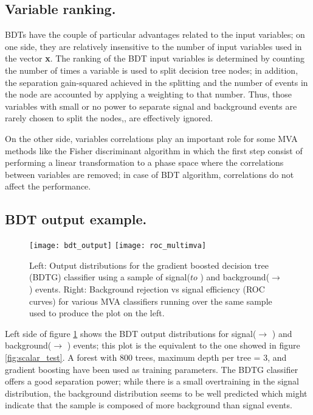 \subsection{Variable ranking.}

BDTs have the couple of particular advantages related to the input variables; on one side, they are relatively insensitive to the number of input variables used in the vector \textbf{x}. The ranking of the BDT input variables is determined by counting the number of times a variable is used to split decision tree nodes; in addition, the separation gain-squared achieved in the splitting and the number of events in the node are accounted by applying a weighting to that number. Thus, those variables with small or no power to separate signal and background events are rarely chosen to split the nodes,\ie, are effectively ignored.

On the other side, variables correlations play an important role for some MVA methods like the Fisher discriminant algorithm in which the first step consist of performing a linear transformation to a phase space where the correlations between variables are removed; in case of BDT algorithm, correlations do not affect the performance.

\subsection{BDT output example.}

\begin{figure}[!h]
  \centering
  \texttt{[image: bdt\_output]}
  \texttt{[image: roc\_multimva]}
  \caption[BDT output example.]{Left: Output distributions for the gradient boosted decision tree (BDTG) classifier using a sample of signal(\pp $to$ \tHq ) and background(\pp $\to$ \ttbar) events. Right: Background rejection vs signal efficiency (ROC curves) for various MVA classifiers running over the same sample used to produce the plot on the left.}\label{fig:bdt_output}
\end{figure}


Left side of figure \ref{fig:bdt_output} shows the BDT output distributions for signal(\pp $\to$ \tHq ) and background(\pp $\to$ \ttbar) events; this plot is the equivalent to the one showed in figure \ref{fig:scalar_test}. A forest with 800 trees, maximum depth per tree = 3, and gradient boosting have been used as training parameters. The BDTG classifier offers a good separation power; while there is a small overtraining in the signal distribution, the background distribution seems to be well predicted which might indicate that the sample is composed of more background than signal events.


